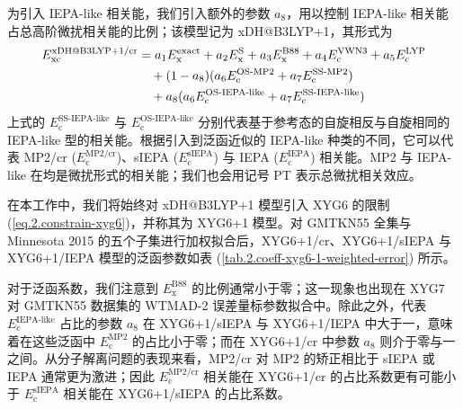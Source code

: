 为引入 IEPA-like 相关能，我们引入额外的参数 $a_8$，用以控制 IEPA-like 相关能占总高阶微扰相关能的比例；该模型记为 xDH@B3LYP+1，其形式为
\begin{align}
  E_\mathrm{xc}^\text{xDH@B3LYP+1/cr} &= a_1 E_\mathrm{x}^\mathrm{exact} + a_2 E_\mathrm{x}^\mathrm{S} + a_3 E_\mathrm{x}^\mathrm{B88} + a_4 E_\mathrm{c}^\mathrm{VWN3} + a_5 E_\mathrm{c}^\mathrm{LYP} \notag \\
  &\quad + (1 - a_8) (a_6 E_\mathrm{c}^\text{OS-MP2} + a_7 E_\mathrm{c}^\text{SS-MP2}) \notag\\
  &\quad + a_8 (a_6 E_\mathrm{c}^\text{OS-IEPA-like} + a_7 E_\mathrm{c}^\text{SS-IEPA-like})
\end{align}
上式的 $E_\mathrm{c}^\text{SS-IEPA-like}$ 与 $E_\mathrm{c}^\text{OS-IEPA-like}$ 分别代表基于参考态的自旋相反与自旋相同的 IEPA-like 型的相关能。根据引入到泛函近似的 IEPA-like 种类的不同，它可以代表 MP2/cr ($E_\mathrm{c}^\mathrm{MP2/cr}$)、sIEPA ($E_\mathrm{c}^\mathrm{sIEPA}$) 与 IEPA ($E_\mathrm{c}^\mathrm{IEPA}$) 相关能。MP2 与 IEPA-like 在均是微扰形式的相关能；我们也会用记号 PT 表示总微扰相关效应。

在本工作中，我们将始终对 xDH@B3LYP+1 模型引入 XYG6 的限制 (\ref{eq.2.constrain-xyg6})，并称其为 XYG6+1 模型。对 GMTKN55 全集与 Minnesota 2015 的五个子集进行加权拟合后，XYG6+1/cr、XYG6+1/sIEPA 与 XYG6+1/IEPA 模型的泛函参数如表 (\ref{tab.2.coeff-xyg6-1-weighted-error}) 所示。

对于泛函系数，我们注意到 $E_\mathrm{x}^\mathrm{B88}$ 的比例通常小于零；这一现象也出现在 XYG7 对 GMTKN55 数据集的 WTMAD-2 误差量标参数拟合中。除此之外，代表 $E_\mathrm{c}^\text{IEPA-like}$ 占比的参数 $a_8$ 在 XYG6+1/sIEPA 与 XYG6+1/IEPA 中大于一，意味着在这些泛函中 $E_\mathrm{c}^\text{MP2}$ 的占比小于零；而在 XYG6+1/cr 中参数 $a_8$ 则介于零与一之间。从分子解离问题的表现来看，MP2/cr 对 MP2 的矫正相比于 sIEPA 或 IEPA 通常更为激进；因此 $E_\mathrm{c}^\text{MP2/cr}$ 相关能在 XYG6+1/cr 的占比系数更有可能小于 $E_\mathrm{c}^\text{sIEPA}$ 相关能在 XYG6+1/sIEPA 的占比系数。

